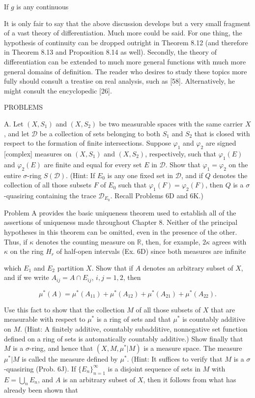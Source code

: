 If $g$ is any continuous

It is only fair to say that the above discussion develops but a very small fragment of a vast theory of differentiation. Much more could be said. For one thing, the hypothesis of continuity can be dropped outright in Theorem 8.12 (and therefore in Theorem 8.13 and Proposition 8.14 as well). Secondly, the theory of differentiation can be extended to much more general functions with much more general domains of definition. The reader who desires to study these topics more fully should consult a treatise on real analysis, such as [58]. Alternatively, he might consult the encyclopedic [26].

PROBLEMS

A. Let $(X, S_1)$ and $(X, S_2)$ be two measurable spaces with the same carrier $X$, and let $\mathcal{D}$ be a collection of sets belonging to both $S_1$ and $S_2$ that is closed with respect to the formation of finite intersections. Suppose $\varphi_1$ and $\varphi_2$ are signed [complex] measures on $(X, S_1)$ and $(X, S_2)$, respectively, such that $\varphi_1(E)$ and $\varphi_2(E)$ are finite and equal for every set $E$ in $\mathcal{D}$. Show that $\varphi_1 = \varphi_2$ on the entire $\sigma$-ring $S(\mathcal{D})$. (Hint: If $E_0$ is any one fixed set in $\mathcal{D}$, and if $Q$ denotes the collection of all those subsets $F$ of $E_0$ such that $\varphi_1(F) = \varphi_2(F)$, then $Q$ is a $\sigma$-quasiring containing the trace $\mathcal{D}_{E_0}$. Recall Problems 6D and 6K.)

Problem A provides the basic uniqueness theorem used to establish all of the assertions of uniqueness made throughout Chapter 8. Neither of the principal hypotheses in this theorem can be omitted, even in the presence of the other. Thus, if $\kappa$ denotes the counting measure on $\mathbb{R}$, then, for example, $2\kappa$ agrees with $\kappa$ on the ring $H_r$ of half-open intervals (Ex. 6D) since both measures are infinite

which $E_1$ and $E_2$ partition $X$. Show that if $A$ denotes an arbitrary subset of $X$, and if we write $A_{ij} = A \cap E_{ij}$, $i, j = 1, 2$, then

$$\mu^*(A) = \mu^*(A_{11}) + \mu^*(A_{12}) + \mu^*(A_{21}) + \mu^*(A_{22}).$$

Use this fact to show that the collection $M$ of all those subsets of $X$ that are measurable with respect to $\mu^*$ is a ring of sets and that $\mu^*$ is countably additive on $M$. (Hint: A finitely additive, countably subadditive, nonnegative set function defined on a ring of sets is automatically countably additive.) Show finally that $M$ is a $\sigma$-ring, and hence that $(X, M, \mu^*|M)$ is a measure space. The measure $\mu^*|M$ is called the measure defined by $\mu^*$. (Hint: It suffices to verify that $M$ is a $\sigma$-quasiring (Prob. 6J). If $\{E_n\}_{n=1}^{\infty}$ is a disjoint sequence of sets in $M$ with $E = \bigcup_n E_n$, and $A$ is an arbitrary subset of $X$, then it follows from what has already been shown that

